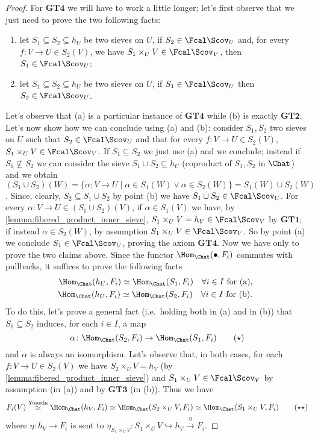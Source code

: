 \documentclass[a4paper]{article}
\begin{document}
\begin{proof}
             For $\mathbf{GT4}$ we will have to work a little longer; let's first observe that we just need to prove the two following facts:
             \begin{enumerate}[label=(\alph*)]
                \item let $S_1 \subseteq S_2 \subseteq h_U$ be two sieves on $U$, if $S_2 \in \Fcal\Scov_U$ and, for every $f\colon V \to U \in S_2(V)$, we have $S_1 \times_U V \in \Fcal\Scov_V$, then $S_1 \in \Fcal\Scov_U$;
                \item let $S_1 \subseteq S_2 \subseteq h_U$ be two sieves on $U$, if $S_1 \in \Fcal\Scov_U$ then $S_2 \in \Fcal\Scov_U$.
             \end{enumerate}
             Let's observe that (a) is a particular instance of $\mathbf{GT4}$ while (b) is exactly $\mathbf{GT2}$. Let's now show how we can conclude using (a) and (b): consider $S_1, S_2$ two sieves on $U$ such that $S_2 \in \Fcal\Scov_U$ and that for every $f\colon V \to U \in S_2(V)$, $S_1 \times_U V \in \Fcal\Scov_V$. If $S_1 \subseteq S_2$ we just use (a) and we conclude; instead if $S_1 \not\subseteq S_2$ we can consider the sieve $S_1 \cup S_2 \subseteq h_U$ (coproduct of $S_1, S_2$ in $\Chat$) and we obtain $(S_1 \cup S_2)(W) = \{\alpha\colon V \to U \mid \alpha \in S_1(W) \lor \alpha \in S_2(W)\} = S_1(W) \cup S_2(W)$. Since, clearly, $S_2 \subseteq S_1 \cup S_2$ by point (b) we have $S_1 \cup S_2 \in \Fcal\Scov_U$. For every $\alpha\colon V \to U \in (S_1 \cup S_2)(V)$, if $\alpha \in S_1(V)$ we have, by \cref{lemma:fibered_product_inner_sieve}, $S_1 \times_U V = h_V \in \Fcal\Scov_V$ by $\mathbf{GT1}$; if instead $\alpha \in S_2(W)$, by assumption $S_1 \times_U V \in \Fcal\Scov_V$. So by point (a) we conclude $S_1 \in \Fcal\Scov_U$, proving the axiom $\mathbf{GT4}$.
             Now we have only to prove the two claims above. Since the functor $\Hom_{\Chat}(\bullet, F_i)$ commutes with pullbacks, it suffices to prove the following facts 
             \begin{gather*}
                 \Hom_{\Chat}(h_U, F_i) \simeq \Hom_{\Chat}(S_1, F_i) \quad \forall i \in I \text{ for (a), }\\
                 \Hom_{\Chat}(h_U, F_i) \simeq \Hom_{\Chat}(S_2, F_i) \quad \forall i \in I \text{ for (b). }
             \end{gather*}
             To do this, let's prove a general fact (i.e.\ holding both in (a) and in (b)) that $S_1 \subseteq S_2$ induces, for each $i \in I$, a map \[\alpha\colon \Hom_{\Chat}(S_2, F_i) \to \Hom_{\Chat}(S_1, F_i) \qquad (\star) \] and $\alpha$ is always an isomorphism. Let's observe that, in both cases, for each $f\colon V \to U \in S_2(V)$ we have $S_2 \times_U V = h_V$ (by \cref{lemma:fibered_product_inner_sieve}) and $S_1 \times_U V \in \Fcal\Scov_V$ by assumption (in (a)) and by $\mathbf{GT3}$ (in (b)). Thus we have \[F_i(V) \stackrel{\textrm{Yoneda}}{\simeq} \Hom_{\Chat}(h_V, F_i) \simeq \Hom_{\Chat}(S_2 \times_U V, F_i) \simeq \Hom_{\Chat}(S_1 \times_U V, F_i) \qquad (\star\star) \] where $\eta\colon h_V \to F_i$ is sent to $\eta_{S_1 \times_U V}\colon S_1 \times_U V \hookrightarrow h_V \stackrel{\eta}{\to} F_i$.

\end{proof}
\end{document}
